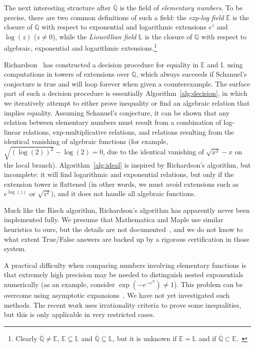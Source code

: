 \documentclass[sigconf,screen,urlbreakonhyphens]{acmart}
\begin{document}
The next interesting structure after $\overline{\mathbb{Q}}$
is the field of \emph{elementary numbers}.
To be precise, there are two common definitions of such a field:
the \emph{exp-log field} $\mathbb{E}$ is the closure of $\mathbb{Q}$
with respect to exponential and logarithmic extensions $e^z$ and $\log(z)$ ($z \ne 0$),
while the \emph{Liouvillian field} $\mathbb{L}$ is
the closure of $\mathbb{Q}$ with respect to algebraic,
exponential and logarithmic extensions.\footnote{Clearly $\overline{\mathbb{Q}} \ne \mathbb{E}$, $\mathbb{E} \subseteq \mathbb{L}$ and $\overline{\mathbb{Q}} \subseteq \mathbb{L}$,
but it is unknown if $\mathbb{E} = \mathbb{L}$ and if $\overline{\mathbb{Q}} \subset \mathbb{E}$.~\cite{Cho1999}}

Richardson~\cite{RF1994, Ric1992, Ric1995, Ric1997, Ric2007, Ric2009} has
constructed a decision procedure for equality in $\mathbb{E}$ and $\mathbb{L}$
using computations in towers of extensions over $\mathbb{Q}$,
which always succeeds
if Schanuel's conjecture is true
and will loop forever when given a counterexample.
The surface part of such a decision procedure is essentially Algorithm~\ref{alg:decision},
in which we iteratively attempt to either prove inequality
or find an algebraic relation that implies equality.
Assuming Schanuel's conjecture, it can be shown that any relation between
elementary numbers must result from a combination of
log-linear relations, exp-multiplicative relations,
and relations resulting from the identical
vanishing of algebraic functions (for example, $\sqrt{(\log(2))^2} - \log(2) = 0$,
due to the identical vanishing of $\sqrt{x^2}-x$ on the local branch).
Algorithm~\ref{alg:ideal} is inspired by Richardson's algorithm,
but incomplete: it will find logarithmic and exponential
relations, but only
if the extension tower is flattened
(in other words, we must avoid
extensions such as $e^{\log(z)}$ or $\sqrt{z^2}$),
and it does not handle all algebraic functions.

Much like the Risch algorithm,
Richardson's algorithm has apparently never been implemented fully.
We presume that Mathematica and Maple use similar
heuristics to ours, but the details
are not documented~\cite{Car2020}, and we do not know to what
extent True/False answers are backed up by a rigorous certification
in those system.

A practical difficulty when comparing numbers involving
elementary functions
is that extremely high precision may be needed
to distinguish nested exponentials numerically (as an
example, consider $\exp(-e^{-e^{N}}) \ne 1$).
This problem can be overcome using asymptotic expansions~\cite{vdH1995}.
We have not yet investigated such methods.
The recent work \cite{Boe2020} uses irrationality criteria
to prove some inequalities,
but this is only applicable in very restricted cases.
\end{document}
